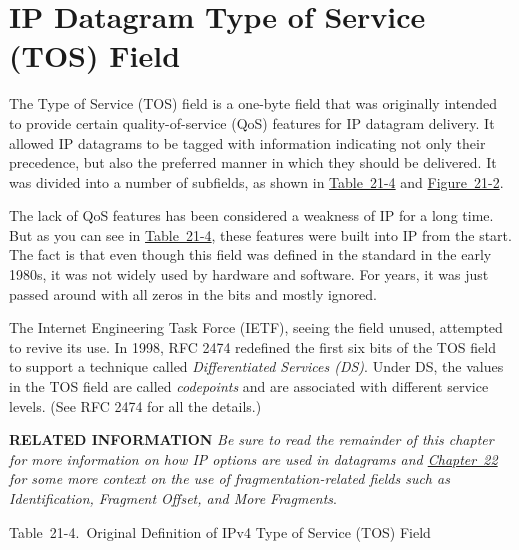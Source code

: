 \section{IP Datagram Type of Service (TOS) Field}

\protect\hypertarget{ch21s02.htmlux5cux23idx-CHP-21-0784}{}{}\protect\hypertarget{ch21s02.htmlux5cux23idx-CHP-21-0785}{}{}The
\protect\hypertarget{ch21s02.htmlux5cux23idx-CHP-21-0786}{}{}Type of
Service (TOS) field is a one-byte field that was originally intended to
provide certain quality-of-service (QoS) features for IP datagram
delivery. It allowed IP datagrams to be tagged with information
indicating not only their precedence, but also the preferred manner in
which they should be delivered. It was divided into a number of
subfields, as shown in
\protect\hyperlink{ch21s02.htmlux5cux23original_definition_of_ipv_type_of_servi}{Table~21-4}
and
\protect\hyperlink{ch21s02.htmlux5cux23ipv4_datagram_format_this_diagram_shows_}{Figure~21-2}.

The lack of QoS features has been considered a weakness of IP for a long
time. But as you can see in
\protect\hyperlink{ch21s02.htmlux5cux23original_definition_of_ipv_type_of_servi}{Table~21-4},
these features were built into IP from the start. The fact is that even
though this field was defined in the standard in the early 1980s, it was
not widely used by hardware and software. For years, it was just passed
around with all zeros in the bits and mostly ignored.

The Internet Engineering Task Force (IETF), seeing the field unused,
attempted to revive its use. In 1998, RFC 2474 redefined the first six
bits of the TOS field to support a technique called
\protect\hypertarget{ch21s02.htmlux5cux23idx-CHP-21-0787}{}{}{\emph{Differentiated
Services (DS)}}. Under DS, the values in the TOS field are called
{\emph{codepoints}} and are associated with different service levels.
(See RFC 2474 for all the details.)


{\textbf{RELATED INFORMATION}} {\emph{Be sure to read the remainder of
this chapter for more information on how IP options are used in
datagrams and \protect\hyperlink{ch22.html}{Chapter~22} for some more
context on the use of fragmentation-related fields such as
Identification, Fragment Offset, and More Fragments}}.

\protect\hypertarget{ch21s02.htmlux5cux23original_definition_of_ipv_type_of_servi}{}{}

Table~21-4.~Original Definition of IPv4 Type of Service (TOS) Field

